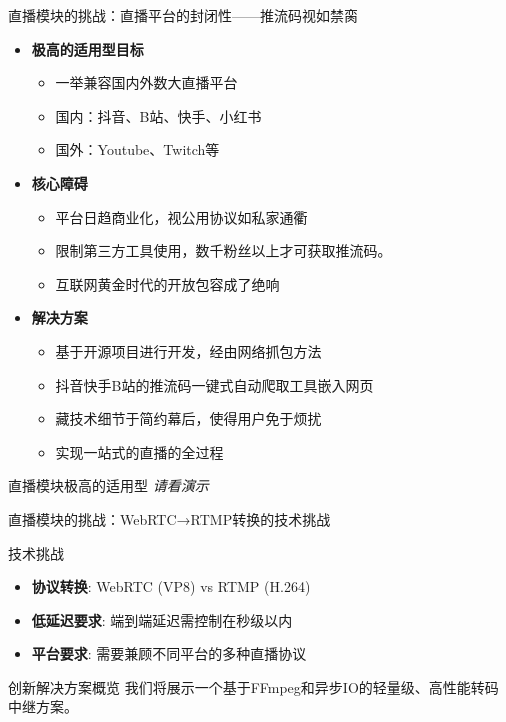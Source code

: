 \documentclass{beamer}
\begin{document}
	\begin{frame}{直播模块的挑战：直播平台的封闭性——推流码视如禁脔}
    	\begin{itemize}
			\item \textbf{极高的适用型目标}
			\begin{itemize}
				\item 一举兼容国内外数大直播平台
				\item 国内：抖音、B站、快手、小红书
				\item 国外：Youtube、Twitch等
			\end{itemize}
		
			\item \textbf{核心障碍}
			\begin{itemize}
				\item 平台日趋商业化，视公用协议如私家通衢
				\item 限制第三方工具使用，数千粉丝以上才可获取推流码。
				\item 互联网黄金时代的开放包容成了绝响
			\end{itemize}
	
			\item \textbf{解决方案}
			\begin{itemize}
				\item 基于开源项目进行开发，经由网络抓包方法
				\item 抖音快手B站的推流码一键式自动爬取工具嵌入网页
				\item 藏技术细节于简约幕后，使得用户免于烦扰
				\item 实现一站式的直播的全过程
			\end{itemize}
		\end{itemize}
	\end{frame}	
	
	\begin{frame}{直播模块极高的适用型}
		\centering
		\textit{请看演示} 
	\end{frame}	
	
	
	\begin{frame}{直播模块的挑战：WebRTC→RTMP转换的技术挑战}
	\begin{block}{技术挑战}
		\begin{itemize}
			\item \textbf{协议转换}: WebRTC (VP8) vs RTMP (H.264)
			\item \textbf{低延迟要求}: 端到端延迟需控制在秒级以内
			\item \textbf{平台要求}: 需要兼顾不同平台的多种直播协议
		\end{itemize}
	\end{block}
	\begin{exampleblock}{创新解决方案概览}
		我们将展示一个基于FFmpeg和异步IO的轻量级、高性能转码中继方案。
	\end{exampleblock}
	\end{frame}
	
\end{document}
